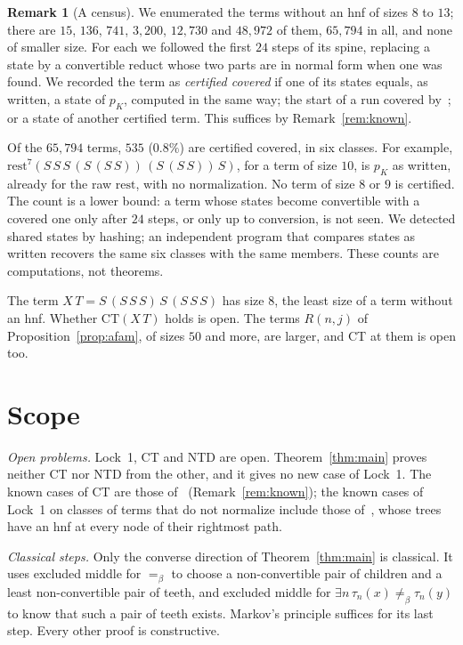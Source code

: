 \documentclass[11pt]{amsart}
\theoremstyle{definition}
\newtheorem{remark}[theorem]{Remark}
\newcommand{\conv}{=_\beta}
\newcommand{\nconv}{\neq_\beta}
\newcommand{\rest}{\mathrm{rest}}
\newcommand{\CT}{\mathrm{CT}}
\begin{document}
\begin{remark}[A census]\label{rem:census}
We enumerated the terms without an hnf of sizes $8$ to $13$; there are $15$, $136$, $741$, $3{,}200$,
$12{,}730$ and $48{,}972$ of them, $65{,}794$ in all, and none of smaller size. For each we followed the
first $24$ steps of its spine, replacing a state by a convertible reduct whose two parts are in normal
form when one was found. We recorded the term as \emph{certified covered} if one of its states
equals, as written, a state of $p_K$, computed in the same way; the start of a run covered
by~\citep[Corollary~3 or~4]{s12}; or a state of another certified term. This suffices by
Remark~\ref{rem:known}.

Of the $65{,}794$ terms, $535$ ($0.8\%$) are certified covered, in six classes. For example,
$\rest^7(S\,S\,S\,(S\,(S\,S))\,(S\,(S\,S))\,S)$, for a term of size $10$, is $p_K$ as written,
already for the raw $\rest$, with no normalization. No term of size $8$ or $9$ is certified. The
count is a lower bound: a term whose states become convertible with a covered one only after $24$
steps, or only up to conversion, is not seen. We detected shared states by hashing; an independent
program that compares states as written recovers the same six classes with the same members. These
counts are computations, not theorems.

The term $X\,T=S\,(S\,S\,S)\,S\,(S\,S\,S)$ has size $8$, the least size of a term without an hnf.
Whether $\CT(X\,T)$ holds is open. The terms $R(n,j)$ of Proposition~\ref{prop:afam}, of sizes $50$
and more, are larger, and CT at them is open too.
\end{remark}

\section{Scope}\label{sec:scope}

\emph{Open problems.} Lock~1, CT and NTD are open. Theorem~\ref{thm:main} proves neither CT nor NTD from
the other, and it gives no new case of Lock~1. The known cases of CT are those of~\citep{s11,s12}
(Remark~\ref{rem:known}); the known cases of Lock~1 on classes of terms that do not normalize
include those of~\citep{s14}, whose trees have an hnf at every node of their rightmost path.

\emph{Classical steps.} Only the converse direction of Theorem~\ref{thm:main} is classical. It uses
excluded middle for $\conv$ to choose a non-convertible pair of children and a least non-convertible
pair of teeth, and excluded middle for $\exists n\,\tau_n(x)\nconv\tau_n(y)$ to know that such a
pair of teeth exists. Markov's principle suffices for its last step. Every other proof is
constructive.
\end{document}
